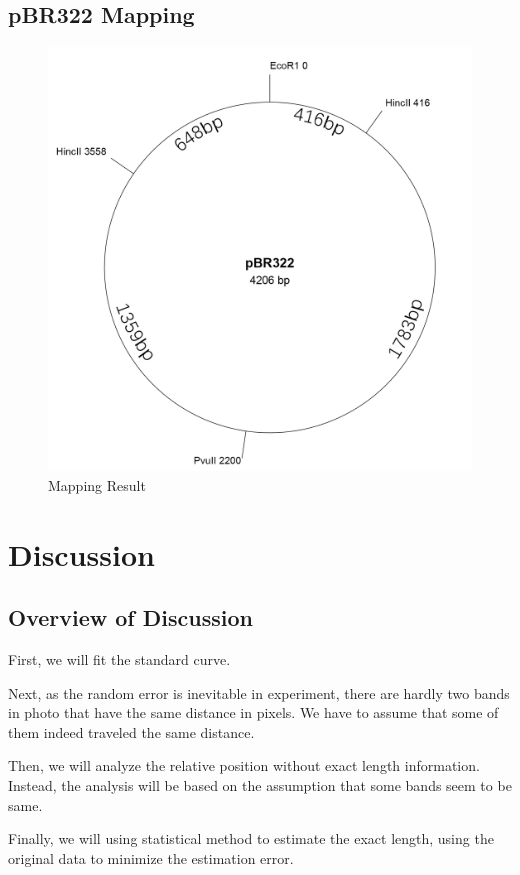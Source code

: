 \documentclass{article}
\begin{document}
        \subsection{pBR322 Mapping}
            \begin{figure}[H]
                \centering
                \includegraphics[width = 0.4\linewidth]{../Data/Plasmid/final.png}
                \caption{Mapping Result}
                \label{final.map}
            \end{figure}
    
    \section{Discussion}
        \subsection{Overview of Discussion}
            First, we will fit the standard curve.

            Next, as the random error is inevitable in experiment, there are hardly two bands in photo that have the same distance in pixels. We have to assume that some of them indeed traveled the same distance.

            Then, we will analyze the relative position without exact length information. Instead, the analysis will be based on the assumption that some bands seem to be same.

            Finally, we will using statistical method to estimate the exact length, using the original data to minimize the estimation error.
\end{document}
